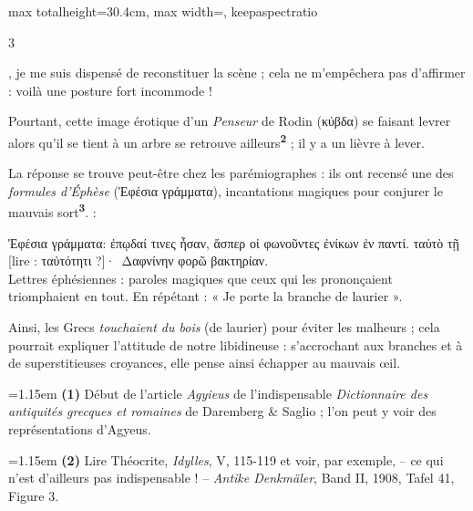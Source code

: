 \documentclass[11pt,twoside]{book}
\newcommand{\italique}[1]{\textit{#1}}
\newcommand{\citComm}[1]{\begin{quoting}[vskip=0.4pt,leftmargin=0.7em,rightmargin=0.2em]#1\end{quoting}}
\newcommand{\latin}[1]{\textit{#1}}
\newcommand{\marqueur}[1]{\textsuperscript{\color{rubricRed}\textbf{#1}}}
\begin{document}
\begin{adjustbox}{max totalheight=30.4cm, max width=\textwidth, keepaspectratio}
\begin{minipage}{\textwidth}
{\begin{multicols}{3}
\par\vspace{1.5pt}
\noindent , je me suis dispensé de reconstituer la scène ; cela ne m'empêchera pas d'affirmer : voilà une posture fort incommode !
\par\vspace{1.5pt}
\noindent Pourtant, cette image érotique d'un \italique{Penseur} de Rodin (κύβδα) se faisant levrer alors qu'il se tient à un arbre se retrouve ailleurs\marqueur{2} ; il y a un lièvre à lever.
\par\vspace{1.5pt}
\noindent La réponse se trouve peut-être chez les parémiographes : ils ont recensé une des \italique{formules d'Éphèse} (Ἐφέσια γράμματα), incantations magiques pour conjurer le mauvais sort\marqueur{3}. :
\citComm{Ἐφέσια γράμματα: ἐπῳδαί τινες ἦσαν, ἅσπερ οἱ φωνοῦντες ἐνίκων ἐν παντί. ταὐτὸ τῇ [lire : ταὐτότητι ?]·\
Δαφνίνην φορῶ βακτηρίαν.\\
Lettres éphésiennes : paroles magiques que ceux qui les prononçaient triomphaient en tout. En répétant :
« Je porte la branche de laurier ».}
\par\vspace{1.5pt}
\noindent Ainsi, les Grecs \italique{touchaient du bois} (de laurier) pour éviter les malheurs ; cela pourrait expliquer l'attitude de notre libidineuse : s'accrochant aux branches et à de superstitieuses croyances, elle pense ainsi échapper au mauvais œil.
\par\vspace{1.5pt}
\par\vspace{1.2pt}\par\nopagebreak\vspace{1pt}\noindent\hangindent=1.15em {\color{sepiaNote}\textbf{(1)}} Début de l'article \latin{Agyieus} de l'indispensable \italique{Dictionnaire des antiquités grecques et romaines} de Daremberg \& Saglio ; l'on peut y voir des représentations d'Agyeus.
\par\vspace{1.5pt}
\noindent\hangindent=1.15em {\color{sepiaNote}\textbf{(2)}} Lire Théocrite, \italique{Idylles}, V, 115-119 et voir, par exemple, – ce qui n'est d'ailleurs pas indispensable ! – \italique{Antike Denkmäler}, Band II, 1908, Tafel 41, Figure 3.
\par\vspace{1.5pt}

\end{multicols}}
\end{minipage}
\end{adjustbox}
\end{document}
